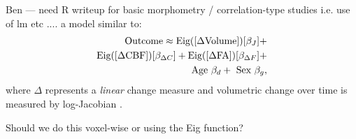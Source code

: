 Ben --- need R writeup for basic morphometry / correlation-type studies i.e. use of
lm etc .... a model similar to: 
\begin{align}
\label{eq:eig2}
  \text{Outcome} \approx \text{Eig}([ \Delta \text{Volume} ]) [
  \beta_J ] + \\ \notag \text{Eig}([ \Delta \text{CBF} ]) [
  \beta_{\Delta  C} ] + \text{Eig}([ \Delta \text{FA} ]) [
  \beta_{\Delta  F} ] \notag + \\ \notag
~\text{Age}~\beta_d + ~\text{Sex}~\beta_g,
\end{align}
where $\Delta$ represents a {\em linear} change measure and volumetric
change over time is measured by log-Jacobian \cite{Rohlfing2006}.  

Should we do this voxel-wise or using the Eig function?

